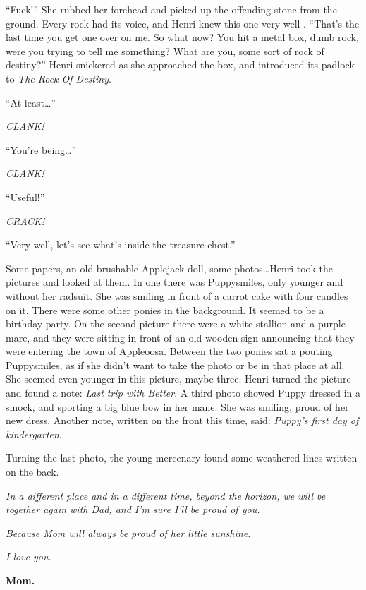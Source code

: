 ``Fuck!'' She rubbed her forehead and picked up the offending stone from the ground. Every rock had its voice, and Henri knew this one very well . ``That's the last time you get one over on me. So what now? You hit a metal box, dumb rock, were you trying to tell me something? What are you, some sort of rock of destiny?'' Henri snickered as she approached the box, and introduced its padlock to \emph{The Rock Of Destiny}.

``At least\dots''

\emph{CLANK!}

``You're being\dots''

\emph{CLANK!}

``Useful!''

\emph{CRACK!}

``Very well, let's see what's inside the treasure chest.''

Some papers, an old brushable Applejack doll, some photos\dots Henri took the pictures and looked at them. In one there was Puppysmiles, only younger and without her radsuit. She was smiling in front of a carrot cake with four candles on it. There were some other ponies in the background. It seemed to be a birthday party. On the second picture there were a white stallion and a purple mare, and they were sitting in front of an old wooden sign announcing that they were entering the town of Appleoosa. Between the two ponies sat a pouting Puppysmiles, as if she didn't want to take the photo or be in that place at all. She seemed even younger in this picture, maybe three. Henri turned the picture and found a note: \emph{Last trip with Better}. A third photo showed Puppy dressed in a smock, and sporting a big blue bow in her mane. She was smiling, proud of her new dress. Another note, written on the front this time, said: \emph{Puppy's first day of kindergarten}.

Turning the last photo, the young mercenary found some weathered lines written on the back.

\medskip

\emph{In a different place and in a different time, beyond the horizon, we will be together again with Dad, and I'm sure I'll be proud of you.}

\emph{Because Mom will always be proud of her little sunshine.}

\emph{I love you.}

\begin{flushright}
\textbf{Mom.}
\end{flushright}


